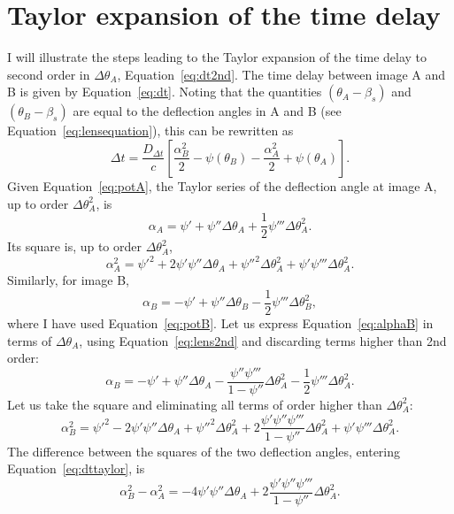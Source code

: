 \documentclass[usenatbib]{mnras}
\def\psii{\psi'}
\def\psiii{\psi''}
\def\psiiii{\psi'''}
\def\Eref#1{Equation~\ref{#1}\xspace}
\begin{document}
\section{Taylor expansion of the time delay}\label{sect:appendixc}
I will illustrate the steps leading to the Taylor expansion of the time delay to second order in $\Delta\theta_A$, \Eref{eq:dt2nd}.
The time delay between image A and B is given by \Eref{eq:dt}. Noting that the quantities $(\theta_A- \beta_s)$ and $(\theta_B - \beta_s)$ are equal to the deflection angles in A and B (see \Eref{eq:lensequation}), this can be rewritten as
\begin{equation}\label{eq:dttaylor}
\Delta t = \frac{D_{\Delta t}}{c}\left[\frac{\alpha_B^2}{2} - \psi(\theta_B) - \frac{\alpha_A^2}{2} + \psi(\theta_A)\right].
\end{equation}
Given \Eref{eq:potA}, the Taylor series of the deflection angle at image A, up to order $\Delta\theta_A^2$, is
\begin{equation}
\alpha_A = \psii + \psiii\Delta\theta_A + \frac12\psiiii\Delta\theta_A^2.
\end{equation}
Its square is, up to order $\Delta\theta_A^2$,
\begin{equation}
\alpha_A^2 = \psi'^{2} + 2\psii\psiii\Delta\theta_A + \psiii^{2}\Delta\theta_A^2 + \psii\psiiii\Delta\theta_A^2.
\end{equation}
Similarly, for image B,
\begin{equation}\label{eq:alphaB}
\alpha_B = -\psii + \psiii\Delta\theta_B - \frac12\psiiii\Delta\theta_B^2,
\end{equation}
where I have used \Eref{eq:potB}. Let us express \Eref{eq:alphaB} in terms of $\Delta\theta_A$, using \Eref{eq:lens2nd} and discarding terms higher than 2nd order:
\begin{equation}\label{eq:alphaBbythetaA}
\alpha_B = -\psii + \psiii\Delta\theta_A - \frac{\psiii\psiiii}{1-\psiii}\Delta\theta_A^2 - \frac12\psiiii\Delta\theta_A^2.
\end{equation}
Let us take the square and eliminating all terms of order higher than $\Delta\theta_A^2$:
\begin{equation}
\alpha_B^2 = \psi'^{2} - 2\psii\psiii\Delta\theta_A + \psi''^{2}\Delta\theta_A^2 + 2\frac{\psii\psiii\psiiii}{1-\psiii}\Delta\theta_A^2 + \psii\psiiii\Delta\theta_A^2.
\end{equation}
The difference between the squares of the two deflection angles, entering \Eref{eq:dttaylor}, is 
\begin{equation}\label{eq:pacco1}
\alpha_B^2 - \alpha_A^2 = -4\psii\psiii\Delta\theta_A + 2\frac{\psii\psiii\psiiii}{1-\psiii}\Delta\theta_A^2.
\end{equation}
\end{document}
